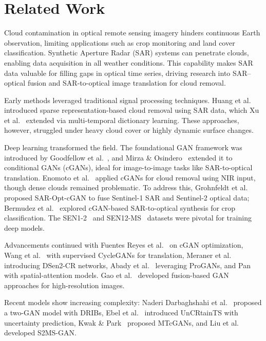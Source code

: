 \section{Related Work}\label{relatedWork}

Cloud contamination in optical remote sensing imagery hinders continuous Earth observation, limiting applications such as crop monitoring and land cover classification. Synthetic Aperture Radar (SAR) systems can penetrate clouds, enabling data acquisition in all weather conditions. This capability makes SAR data valuable for filling gaps in optical time series, driving research into SAR–optical fusion and SAR-to-optical image translation for cloud removal.

Early methods leveraged traditional signal processing techniques. Huang et al.~\cite{huang2015} introduced sparse representation-based cloud removal using SAR data, which Xu et al.~\cite{xu2016} extended via multi-temporal dictionary learning. These approaches, however, struggled under heavy cloud cover or highly dynamic surface changes.

Deep learning transformed the field. The foundational GAN framework was introduced by Goodfellow et al.~\cite{goodfellow2014}, and Mirza \& Osindero~\cite{mirza2014} extended it to conditional GANs (cGANs), ideal for image-to-image tasks like SAR-to-optical translation. Enomoto et al.~\cite{enomoto2017} applied cGANs for cloud removal using NIR input, though dense clouds remained problematic. To address this, Grohnfeldt et al.~\cite{grohnfeldt2018} proposed SAR-Opt-cGAN to fuse Sentinel-1 SAR and Sentinel-2 optical data; Bermudez et al.~\cite{bermudez2018} explored cGAN-based SAR-to-optical synthesis for crop classification. The SEN1-2~\cite{schmitt2018} and SEN12-MS~\cite{schmitt2019} datasets were pivotal for training deep models.

Advancements continued with Fuentes Reyes et al.~\cite{fuentes2019} on cGAN optimization, Wang et al.~\cite{wang2019} with supervised CycleGANs for translation, Meraner et al.~\cite{meraner2020} introducing DSen2-CR networks, Abady et al.~\cite{abady2020} leveraging ProGANs, and Pan~\cite{pan2020} with spatial-attention models. Gao et al.~\cite{gao2020} developed fusion-based GAN approaches for high-resolution images.

Recent models show increasing complexity: Naderi Darbaghshahi et al.~\cite{naderi2021} proposed a two-GAN model with DRIBs, Ebel et al.~\cite{ebel2022} introduced UnCRtainTS with uncertainty prediction, Kwak \& Park~\cite{kwak2024} proposed MTcGANs, and Liu et al.~\cite{liu2024} developed S2MS-GAN.

